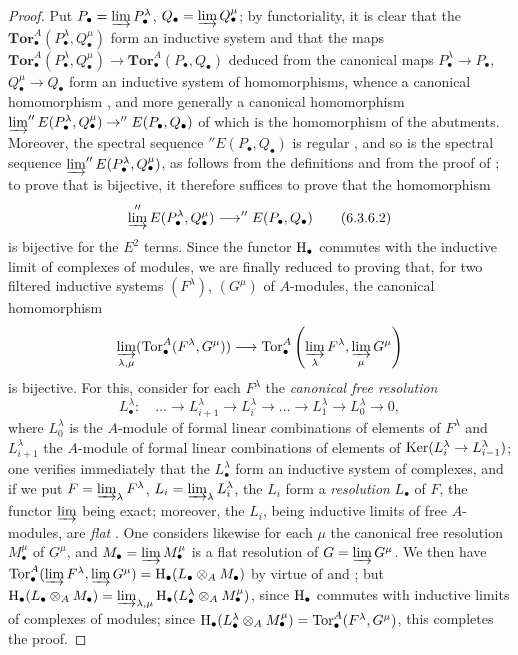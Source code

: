 \begin{proof}
Put $P_\bullet=\varinjlim P_\bullet^\lambda$,
$Q_\bullet=\varinjlim Q_\bullet^\mu$; by functoriality, it is clear that
the $\mathbf{Tor}_\bullet^A(P_\bullet^\lambda,Q_\bullet^\mu)$ form an
inductive system and that the maps
$\mathbf{Tor}_\bullet^A(P_\bullet^\lambda,Q_\bullet^\mu)\to
\mathbf{Tor}_\bullet^A(P_\bullet,Q_\bullet)$ deduced
from the canonical maps $P_\bullet^\lambda\to P_\bullet$,
$Q_\bullet^\mu\to Q_\bullet$ form an inductive system of homomorphisms,
whence a canonical homomorphism , and more generally a
canonical homomorphism
$\varinjlim''E(P_\bullet^\lambda,Q_\bullet^\mu)\to''E(P_\bullet,Q_\bullet)$
of which  is the homomorphism of the abutments.  Moreover, the
spectral sequence $''E(P_\bullet,Q_\bullet)$ is regular , and so
is the spectral sequence
$\varinjlim''E(P_\bullet^\lambda,Q_\bullet^\mu)$, as
follows from the definitions  and from the proof of
; to prove that  is bijective, it therefore
suffices  to prove that the homomorphism
\[
  \varinjlim''E(P_\bullet^\lambda,Q_\bullet^\mu)
  \longrightarrow
  ''E(P_\bullet,Q_\bullet)
  \tag{6.3.6.2}\label{III.6.3.6.2}
\]
is bijective for the $E^2$ terms.  Since the functor $\mathrm{H}_\bullet$ commutes with
the inductive limit of complexes of modules, we are finally reduced to
proving that, for two filtered inductive systems $(F^\lambda)$,
$(G^\mu)$ of $A$-modules, the canonical homomorphism
\[
  \varinjlim_{\lambda,\mu}(\operatorname{Tor}_\bullet^A(F^\lambda,G^\mu))
  \longrightarrow
  \operatorname{Tor}_\bullet^A\left(
    \varinjlim_\lambda F^\lambda,
    \varinjlim_\mu G^\mu
  \right)
\]
is bijective.  For this, consider for each $F^\lambda$ the \emph{canonical
free resolution}
\[
  L_\bullet^\lambda:\quad
  \ldots\longrightarrow L_{i+1}^\lambda
  \longrightarrow L_i^\lambda
  \longrightarrow\ldots\longrightarrow
  L_1^\lambda\longrightarrow L_0^\lambda\longrightarrow0,
\]
where $L_0^\lambda$ is the $A$-module of formal linear
combinations of elements of $F^\lambda$ and
$L_{i+1}^\lambda$ the $A$-module of formal linear combinations
of elements of
$\operatorname{Ker}(L_i^\lambda\to L_{i-1}^\lambda)$; one verifies immediately that the
$L_\bullet^\lambda$ form an inductive system of complexes, and if we put
$F=\varinjlim_\lambda F^\lambda$, $L_i=\varinjlim_\lambda L_i^\lambda$, the
$L_i$ form a \emph{resolution} $L_\bullet$ of $F$, the functor
$\varinjlim$ being exact; moreover, the $L_i$, being inductive limits of free
$A$-modules, are \emph{flat} .  One considers
likewise for each $\mu$ the canonical free resolution $M_\bullet^\mu$ of
$G^\mu$, and $M_\bullet=\varinjlim M_\bullet^\mu$ is a flat resolution
of $G=\varinjlim G^\mu$.  We then have
$\operatorname{Tor}_\bullet^A(\varinjlim F^\lambda,
\varinjlim G^\mu)=\mathrm{H}_\bullet(L_\bullet\otimes_A M_\bullet)$ by virtue of
 and ; but
$\mathrm{H}_\bullet(L_\bullet\otimes_A M_\bullet)
=\varinjlim_{\lambda,\mu}
\mathrm{H}_\bullet(L_\bullet^\lambda\otimes_A M_\bullet^\mu)$,
since $\mathrm{H}_\bullet$ commutes with inductive limits of complexes of modules;
since $\mathrm{H}_\bullet(L_\bullet^\lambda\otimes_A M_\bullet^\mu)
=\operatorname{Tor}_\bullet^A(F^\lambda,G^\mu)$, this completes the
proof.


\end{proof}
